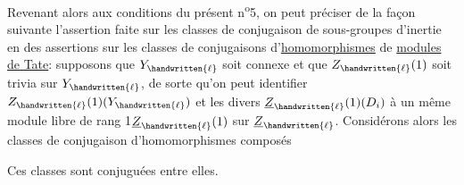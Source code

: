Revenant alors aux conditions du présent n\textsuperscript{o}5, on peut préciser de la façon suivante l'assertion faite sur les  classes de conjugaison de sous-groupes d'inertie en des assertions sur les classes de conjugaisons d'\uline{homomorphismes} de \uline{modules de Tate}: supposons que $Y_{\handwritten{\ell}}$ soit connexe et que $Z_{\handwritten{\ell}}(1)$ soit trivia sur $Y_{\handwritten{\ell}}$,  de sorte qu'on peut identifier $Z_{\handwritten{\ell}}(1)(Y_{\handwritten{\ell}})$ et les divers $\underline{Z}_{\handwritten{\ell}}(1)(D_i)$ à un même module \handwritten{(}libre de rang 1\handwritten{)}$\underline{Z}_{\handwritten{\ell}}(1)$ sur $\underline{Z}_{\handwritten{\ell}}$. Considérons alors les classes de conjugaison d'homomorphismes composés

Ces classes sont conjuguées entre elles.
